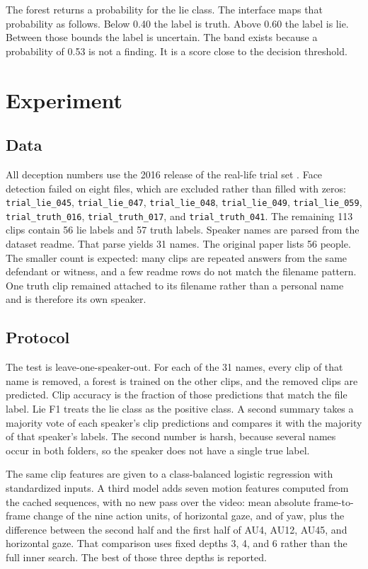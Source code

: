 \documentclass[conference]{IEEEtran}
\begin{document}
The forest returns a probability for the lie class. The interface maps that probability as follows. Below 0.40 the label is truth. Above 0.60 the label is lie. Between those bounds the label is uncertain. The band exists because a probability of 0.53 is not a finding. It is a score close to the decision threshold.

\section{Experiment}
\subsection{Data}
All deception numbers use the 2016 release of the real-life trial set \cite{perez2015trial}. Face detection failed on eight files, which are excluded rather than filled with zeros: \texttt{trial\_lie\_045}, \texttt{trial\_lie\_047}, \texttt{trial\_lie\_048}, \texttt{trial\_lie\_049}, \texttt{trial\_lie\_059}, \texttt{trial\_truth\_016}, \texttt{trial\_truth\_017}, and \texttt{trial\_truth\_041}. The remaining 113 clips contain 56 lie labels and 57 truth labels. Speaker names are parsed from the dataset readme. That parse yields 31 names. The original paper lists 56 people. The smaller count is expected: many clips are repeated answers from the same defendant or witness, and a few readme rows do not match the filename pattern. One truth clip remained attached to its filename rather than a personal name and is therefore its own speaker.

\subsection{Protocol}
The test is leave-one-speaker-out. For each of the 31 names, every clip of that name is removed, a forest is trained on the other clips, and the removed clips are predicted. Clip accuracy is the fraction of those predictions that match the file label. Lie F1 treats the lie class as the positive class. A second summary takes a majority vote of each speaker's clip predictions and compares it with the majority of that speaker's labels. The second number is harsh, because several names occur in both folders, so the speaker does not have a single true label.

The same clip features are given to a class-balanced logistic regression with standardized inputs. A third model adds seven motion features computed from the cached sequences, with no new pass over the video: mean absolute frame-to-frame change of the nine action units, of horizontal gaze, and of yaw, plus the difference between the second half and the first half of AU4, AU12, AU45, and horizontal gaze. That comparison uses fixed depths 3, 4, and 6 rather than the full inner search. The best of those three depths is reported.
\end{document}

